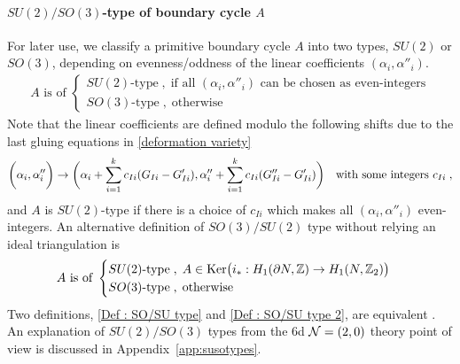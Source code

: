 \documentclass[a4paper,11pt]{article}
\def\CN{{\cal N}}
\begin{document}
\paragraph{$SU(2)/SO(3)$-type  of boundary cycle $A$} For later use, we classify a primitive boundary cycle $A$ into two types, $SU(2)$ or $SO(3)$, depending on evenness/oddness of the linear coefficients $(\alpha_i, \alpha''_i)$. 
%
\begin{align}
A \textrm{ is of }
 \begin{cases}
 \textrm{$SU(2)$-type}\;,\;\textrm{if all $(\alpha_i, \alpha''_i)$ can be chosen as even-integers}
 \\
\textrm{$SO(3)$-type}\;,\;\textrm{otherwise} 
\end{cases} \label{Def : SO/SU type}
\end{align}
%
Note that the linear coefficients are defined modulo the following shifts due to the last gluing equations in \eqref{deformation variety}
%
\begin{align}
 \bigg{(}\alpha_i, \alpha''_i \bigg{)}\rightarrow \bigg{(} \alpha_i + \sum_{i=1}^k c_{Ii}(G_{Ii}-G'_{Ii}), \alpha''_i + \sum_{i=1}^k c_{Ii} (G''_{Ii} - G'_{Ii})\bigg{)}\quad \textrm{with some integers $c_{Ii}$}\;,\nonumber
\end{align}
%
and $A$ is $SU(2)$-type if there is a choice of $c_{Ii}$ which makes all $(\alpha_i, \alpha''_i)$ even-integers. An  alternative definition of $SO(3)/SU(2)$ type without relying an ideal triangulation is 
%
\begin{align}
A \textrm{ is of }
 \begin{cases}
 \textrm{$SU(2)$-type}\;,\; A \in \textrm{Ker} \big{(} i_* : H_1 (\partial N, \mathbb{Z})\rightarrow H_1 (N, \mathbb{Z}_2) \big{)}
 \\
\textrm{$SO(3)$-type}\;,\;\textrm{otherwise} 
\end{cases} \label{Def : SO/SU type 2}
\end{align}
%
Two definitions, \eqref{Def : SO/SU type} and  \eqref{Def : SO/SU type 2}, are equivalent \cite{neumann1992combinatorics}.
An explanation of $SU(2)/SO(3)$ types from the 6d $\CN=(2,0)$ theory point of view is discussed in Appendix~\ref{app:susotypes}.
\end{document}
